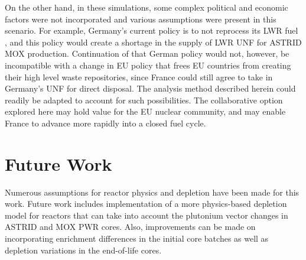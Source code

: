 On the other hand, in these simulations, some complex political and economic factors were not incorporated and various assumptions were present in this scenario. For
example, Germany's current policy is to not reprocess its \gls{LWR} fuel
\cite{topfer_germanys_2011}, and this policy would create a shortage
in the supply of \gls{LWR} \gls{UNF} for \gls{ASTRID} \gls{MOX} production.
Continuation of that German policy would not, however, be incompatible
with a change in \gls{EU} policy that frees \gls{EU} countries from
creating their high level waste repositories, since France could still
agree to take in Germany's \gls{UNF} for direct disposal. The analysis
method described herein could readily be adapted to account for such possibilities. 
The collaborative option explored here may hold value for the \gls{EU} nuclear community,
and may enable France to advance more rapidly into a closed fuel cycle. 
\FloatBarrier


\section{Future Work}

Numerous assumptions for reactor physics and depletion
have been made for this work. Future work includes implementation of
a more physics-based depletion model for reactors that
can take into account the plutonium vector changes in  \gls{ASTRID} and \gls{MOX} \gls{PWR} cores.
Also, improvements can be made on incorporating enrichment differences in the initial core
batches as well as depletion variations in the end-of-life cores.
